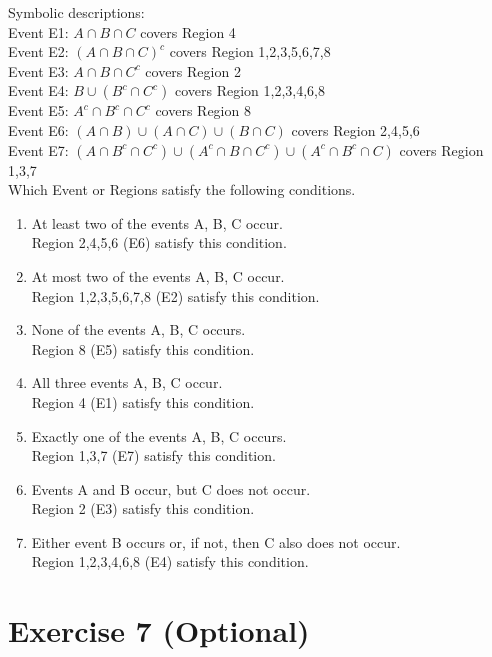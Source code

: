 \documentclass[12pt,thmsa]{article}
\begin{document}
\noindent Symbolic descriptions: \\
Event E1: $A \cap B \cap C$ covers Region {4}\\
Event E2: $(A\cap B \cap C)^c $ covers Region {1,2,3,5,6,7,8} \\
Event E3: $ A \cap B \cap C^c $ covers Region {2} \\
Event E4: $B \cup (B^c \cap C^c)$ covers Region {1,2,3,4,6,8}\\
Event E5: $A^c \cap B^c \cap C^c $ covers Region {8} \\
Event E6: $(A \cap B) \cup (A \cap C) \cup (B \cap C)$ covers Region {2,4,5,6} \\
Event E7: $(A \cap B^c \cap C^c) \cup (A^c \cap B \cap C^c) \cup (A^c \cap B^c \cap C) $ covers Region {1,3,7}\\

\noindent Which Event or Regions satisfy the following conditions. 
\begin{enumerate}
\item At least two of the events A, B, C occur. \\
Region {2,4,5,6} (E6) satisfy this condition.
\item At most two of the events A, B, C occur. \\
Region {1,2,3,5,6,7,8} (E2) satisfy this condition.
\item None of the events A, B, C occurs. \\
Region {8} (E5) satisfy this condition.
\item All three events A, B, C occur. \\
Region {4} (E1) satisfy this condition.
\item Exactly one of the events A, B, C occurs.\\
Region {1,3,7} (E7) satisfy this condition.
\item Events A and B occur, but C does not occur. \\
Region {2} (E3) satisfy this condition.
\item Either event B occurs or, if not, then C also does not occur.\\
Region {1,2,3,4,6,8} (E4) satisfy this condition.


\end{enumerate}

\section*{Exercise 7 (Optional)}
\end{document}
